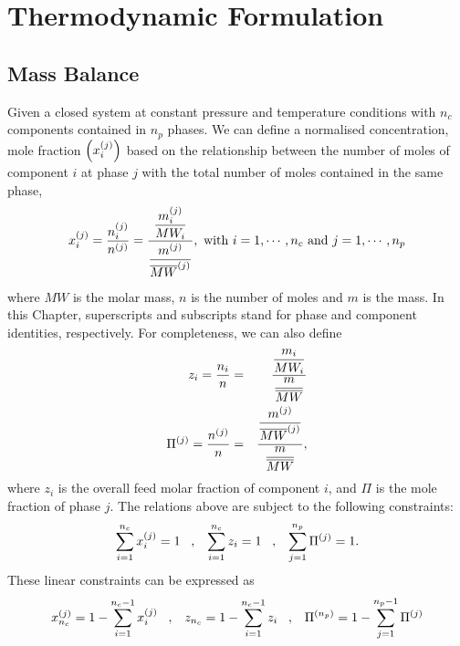 
\chapter{Thermodynamic Formulation}\label{Chapter:ThermodynamicFormulation}

\section{Mass Balance}\label{Chapter:ThermodynamicFormulation:Section:MassBalance}
Given a closed system at constant pressure and temperature conditions with $n_{c}$ components contained in $n_{p}$ phases. We can define a normalised concentration, \ie mole fraction $\left(\mfr[x]{i}{j}\right)$ based on the relationship between the number of moles of component $i$ at phase $j$ with the total number of moles contained in the same phase, 
\begin{equation}
    \mfr[x]{i}{j} = \frc{\mfr[n]{i}{j}}{\mfr[n]{}{j}} = \frc{\frc{\mfr[m]{i}{j}}{MW_{i}}}{\frc{\mfr[m]{}{j}}{\mfr[\overline{MW}]{}{j}}}, \hfill \text{ with } i=1, \cdots, n_{c} \text{ and } j=1, \cdots, n_{p}
\label{Chapter:ThermodynamicFormulation:Eqn:MoleFractionDef}
\end{equation}
where $MW$ is the molar mass, $n$ is the number of moles and $m$ is the mass. In this Chapter, superscripts and subscripts stand for phase and component identities, respectively.  For completeness, we can also define
\begin{eqnarray}
    z_{i} = \frc{n_{i}}{n} &=& \frc{\frc{m_{i}}{MW_{i}}}{\frc{m}{\overline{MW}}}\label{Chapter:ThermodynamicFormulation:Eqn:FeedFractionDef} \\
    \mfr[\Pi]{}{j} = \frc{\mfr[n]{}{j}}{n} &=& \frc{\frc{\mfr[m]{}{j}}{\mfr[\overline{MW}]{}{j}}}{\frc{m}{\overline{MW}}},\label{Chapter:ThermodynamicFormulation:Eqn:PhaseFractionDef} 
\end{eqnarray}
where $z_{i}$ is the overall feed molar fraction of component $i$, and $\Pi$ is the mole fraction of phase $j$. The relations above are subject to the following constraints:
\begin{equation}
    \summation_{i=1}^{n_{c}}\mfr[x]{i}{j} = 1 \;\;\;,\;\;\; \summation_{i=1}^{n_{c}}z_{i} = 1 \;\;\;,\;\;\; \summation_{j=1}^{n_{p}}\mfr[\Pi]{}{j} = 1. \label{Chapter:ThermodynamicFormulation:Eqn:FractionConstraints1}
\end{equation}
These linear constraints can be expressed as
\begin{equation}
    \mfr[x]{n_{c}}{j}= 1 - \summation_{i=1}^{n_{c}-1}\mfr[x]{i}{j} \;\;\;,\;\;\; z_{n_{c}}= 1 - \summation_{i=1}^{n_{c}-1}z_{i} \;\;\;,\;\;\; \mfr[\Pi]{}{n_{p}} = 1 - \summation_{j=1}^{n_{p}-1}\mfr[\Pi]{}{j} \label{Chapter:ThermodynamicFormulation:Eqn:FractionConstraints2}
\end{equation}
